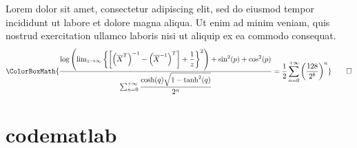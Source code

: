 \begin{codelatex}
	Lorem dolor sit amet, consectetur adipiscing elit, sed do eiusmod tempor incididunt ut labore et dolore magna aliqua. Ut enim ad minim veniam, quis nostrud exercitation ullamco laboris nisi ut aliquip ex ea commodo consequat.
	\begin{equation*}
		\ColorBoxMath{\dfrac{\log\left(\lim_{z\to\infty}\left\{\left[\left(\overline{X}^{T}\right)^{-1}-\left(\overline{X}^{-1}\right)^T\right]+\dfrac{1}{z}\right\}^2\right)+\sin^2(p)+\cos^2(p)}{\sum_{n=0}^{+\infty}\dfrac{\cosh(q)\sqrt{1-\tanh^2(q)}}{2^n}}=\dfrac{1}{2}\sum_{n=0}^{+\infty}\left(\dfrac{128}{2^8}\right)^n}\qedhere
	\end{equation*}
\end{codelatex}

\newpage

\section{codematlab}


